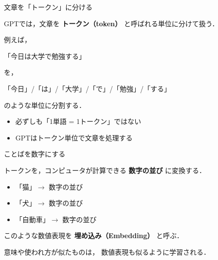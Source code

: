 \documentclass[aspectratio=169,professionalfonts]{beamer}
\begin{document}
\begin{frame}{文章を「トークン」に分ける}

  GPTでは，文章を
  \textbf{トークン（token）}
  と呼ばれる単位に分けて扱う．

  \vspace{1em}

  例えば，

  \begin{center}
    「今日は大学で勉強する」
  \end{center}

  を，

  \begin{center}
    「今日」/「は」/「大学」/「で」/「勉強」/「する」
  \end{center}

  のような単位に分割する．

  \vspace{1em}

  \begin{itemize}
    \item 必ずしも「1単語 = 1トークン」ではない
    \item GPTはトークン単位で文章を処理する
  \end{itemize}


\end{frame}


\begin{frame}{ことばを数字にする}

  トークンを，コンピュータが計算できる
  \textbf{数字の並び}
  に変換する．

  \vspace{1em}

  \begin{itemize}
    \item 「猫」$\rightarrow$ 数字の並び
    \item 「犬」$\rightarrow$ 数字の並び
    \item 「自動車」$\rightarrow$ 数字の並び
  \end{itemize}

  \vspace{1em}

  このような数値表現を
  \textbf{埋め込み（Embedding）}
  と呼ぶ．

  \vspace{1em}

  意味や使われ方が似たものは，
  数値表現も似るように学習される．


\end{frame}
\end{document}
